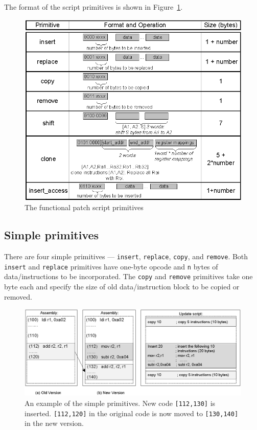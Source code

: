 The format of the script primitives is shown in Figure~\ref{fscript}. 

\begin{figure}[htbp]
\centering
\includegraphics[scale=1.2]{figures/fopcode.eps}
\caption{The functional patch script primitives}
\label{fscript}
\end{figure}


\subsection{Simple primitives}

There are four simple primitives --- {\tt insert}, {\tt replace}, {\tt copy}, and {\tt remove}. Both {\tt insert} and {\tt replace} primitives have one-byte opcode and {\tt n} bytes of data/instructions to be incorporated.  The {\tt copy} and {\tt remove} primitives take one byte each and specify the size of old data/instruction block to be
copied or removed.

\begin{figure}[htbp]
\centering
\includegraphics[width=6in]{figures/sother.eps}
\caption[An example of the simple primitives.]{An example of the simple primitives. 
New code {\tt [112,130]} is inserted.
{\tt [112,120]} in the original code is now moved to {\tt [130,140]} 
in the new version.
}
\label{fsother}
\end{figure}

